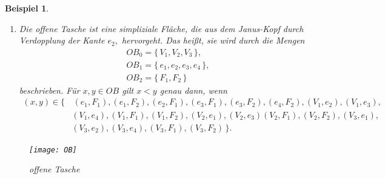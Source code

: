 \documentclass[12pt,titlepage,twoside,cleardoublepage]{article}
\theoremstyle{nummermitklammern}
\newtheorem{bsp}[temp]{Beispiel}
\newtheorem{bsp}[zahl]{Beispiel}
\numberwithin{equation}{section}
\begin{document}
\begin{bsp}
\begin{enumerate}
 \begin{align*}
 &J_{0}=\{\,V_{1},V_{2},V_{3}\,\} ,\\
 &J_{1}=\{\,e_{1},e_{2},e_{3}\,\},\\
 &J_{2}=\{\, F_{1},F_{2}\,\}
\end{align*}
definiert. Für $x,y\in J$ gilt $x<y$ genau dann, wenn
\begin{align*} 
 (x,y)\in\{&\,(e_{1},F_{1}),(e_{1},F_{2}),(e_{2},F_{1}),(e_{2},F_{2}),(e_{3},F_{1}),(e_{3},F_{2}),(V_{1},e_{2}),(V_{1},e_{3}),\\ &(V_{1},F_{1}),
  (V_{1},F_{2}),(V_{2},e_{1}),(V_{2},e_{3}),(V_{2},F_{1})
 (V_{2},F_{2}), (V_{3},e_{1}), (V_{3},e_{2}),\\&(V_{3},F_{1}),(V_{3},F_{2}) \,\}.
 \end{align*}

\begin{figure}[H]
\begin{center}
\texttt{[image: JanusHead]}
\end{center}
\caption{Janus-Kopf}
\end{figure}
 \item 
 Die \emph{offene Tasche} ist eine simpliziale Fläche, die aus dem \emph{Janus-Kopf} durch Verdopplung der Kante $e_{2},$ hervorgeht. Das heißt, sie wird durch die Mengen
 \begin{align*}
&  OB_{0}=\{\,V_{1},V_{2},V_{3}\,\},\\
 & OB_{1}=\{\,e_{1},e_{2},e_{3},e_{4} \,\},\\
  &OB_{2}=\{\,F_{1},F_{2}\,\}
  \end{align*}
  beschrieben. Für  $x,y\in OB$ gilt $x<y$ genau dann, wenn \begin{align*}
 (x,y)\in\{&\,(e_{1},F_{1}),(e_{1},F_{2}),(e_{2},F_{1}),(e_{3},F_{1}),(e_{3},F_{2}),(e_{4},F_{2}),(V_{1},e_{2}),(V_{1},e_{3}),\\ &(V_{1},e_{4}),
  (V_{1},F_{1}),(V_{1},F_{2}),(V_{2},e_{1}),(V_{2},e_{3})
 (V_{2},F_{1}), (V_{2},F_{2}), (V_{3},e_{1}),\\&(V_{3},e_{2}),(V_{3},e_{4}),(V_{3},F_{1}),(V_3,F_2) \,\}.
 \end{align*}
 \end{enumerate}
\begin{figure}[H]
\begin{center}
\texttt{[image: OB]}
\end{center}
\caption{offene Tasche}
\end{figure}
\end{bsp}
\end{document}
